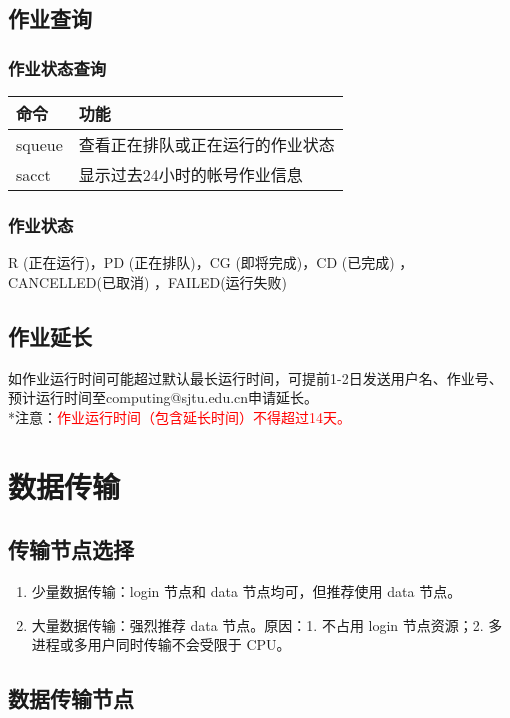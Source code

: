 \documentclass[cn, 12pt, hang, black, chinese]{elegantbook}
\begin{document}
\section{作业查询}

\subsection*{作业状态查询}
\begin{tabular}{ |l|l| }
 \hline
 命令 & 功能 \\
 \hline \hline
 squeue & 查看正在排队或正在运行的作业状态 \\
 \hline
 sacct & 显示过去24小时的帐号作业信息 \\
 \hline
\end{tabular}

\subsection*{作业状态}
R (正在运行)，PD (正在排队)，CG (即将完成)，CD (已完成) ，CANCELLED(已取消) ，FAILED(运行失败)

\section{作业延长}
如作业运行时间可能超过默认最长运行时间，可提前1-2日发送用户名、作业号、预计运行时间至computing@sjtu.edu.cn申请延长。\\
*注意：\textcolor{red}{作业运行时间（包含延长时间）不得超过14天。}

\chapter{数据传输}

\section{传输节点选择}
\begin{enumerate}
\item 少量数据传输：login 节点和 data 节点均可，但推荐使用 data 节点。
\item 大量数据传输：强烈推荐 data 节点。原因：1. 不占用 login 节点资源；2. 多进程或多用户同时传输不会受限于 CPU。
\end{enumerate}

\section{数据传输节点}
\end{document}

